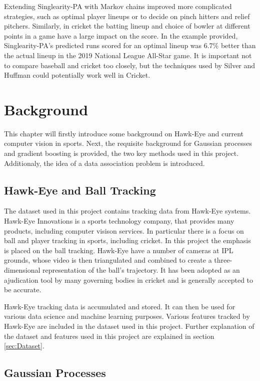 \documentclass[12pt,a4paper]{report}
\theoremstyle{definition}
\begin{document}
Extending Singlearity-PA with Markov chains improved more complicated strategies, such as optimal player lineups or to decide on pinch hitters and relief pitchers. 
Similarly, in cricket the batting lineup and choice of bowler at different points in a game have a large impact on the score. 
In the example provided, Singlearity-PA's predicted runs scored for an optimal lineup was 6.7\% better than the actual lineup in the 2019 National League All-Star game. 
It is important not to compare baseball and cricket too closely, but the techniques used by Silver and Huffman could potentially work well in Cricket.

\chapter{Background}

This chapter will firstly introduce some background on Hawk-Eye and current computer vision in sports.
Next, the requisite background for Gaussian processes and gradient boosting is provided, the two key methods used in this project.
Additionaly, the idea of a data association problem is introduced. 

\section{Hawk-Eye and Ball Tracking}

The dataset used in this project contains tracking data from Hawk-Eye systems.
Hawk-Eye Innovations is a sports technology company, that provides many products, including computer visison services.
In particular there is a focus on ball and player tracking in sports, including cricket.
In this project the emphasis is placed on the ball tracking.
Hawk-Eye have a number of cameras at IPL grounds, whose video is then triangulated and combined to create a three-dimensional representation of the ball's trajectory.
It has been adopted as an ajudication tool by many governing bodies in cricket and is generally accepted to be accurate.

Hawk-Eye tracking data is accumulated and stored. 
It can then be used for various data science and machine learning purposes.
Various features tracked by Hawk-Eye are included in the dataset used in this project.
Further explanation of the dataset and features used in this project are explained in section \ref{sec:Dataset}.

\section{Gaussian Processes}
\end{document}
